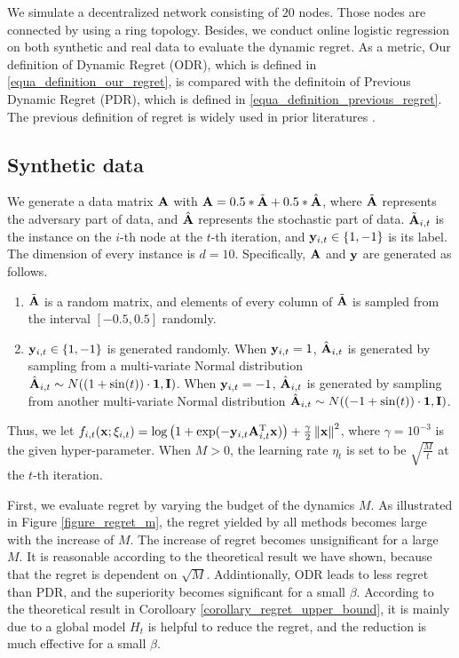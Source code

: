 \documentclass{article}
\begin{document}
We simulate a decentralized network consisting of $20$ nodes. Those nodes are connected by using a ring topology. Besides, we conduct online logistic regression on both synthetic and real data to evaluate the dynamic regret. As a metric, Our definition of Dynamic Regret (ODR), which is defined in \eqref{equa_definition_our_regret}, is compared with the  definitoin of Previous  Dynamic Regret (PDR), which is defined in \eqref{equa_definition_previous_regret}. The previous definition of regret is widely used in prior literatures \citep{Zinkevich:2003,Gyorgy:2016,8015179Shahram,Zhao:2018wx}. 


\subsection{Synthetic data}




We generate a data matrix ${\bf A}$ with ${\bf A}=0.5*\tilde{{\bf A}}+0.5*\hat{{\bf A}}$, where $\tilde{{\bf A}}$ represents the adversary part of data, and $\hat{{\bf A}}$ represents the stochastic part of data. $\tilde{{\bf A}}_{i,t}$ is the instance on the $i$-th node at the $t$-th iteration, and ${\bf y}_{i,t}\in\{1,-1\}$ is its label. The dimension of every instance is $d = 10$. Specifically, ${\bf A}$ and ${\bf y}$ are generated as follows.
\begin{enumerate}
\item $\tilde{{\bf A}}$ is a random matrix, and elements of every column of $\tilde{{\bf A}}$ is sampled from the interval $[-0.5,0.5]$ randomly.
\item ${\bf y}_{i,t}\in\{1,-1\}$ is generated randomly. When ${\bf y}_{i,t}=1$, $\hat{{\bf A}}_{i,t}$ is generated by sampling from a multi-variate Normal distribution $\hat{{\bf A}}_{i,t} \sim N((1+\sin(t))\cdot{\bf 1}, {\bf I})$. When ${\bf y}_{i,t} = -1$, $\hat{{\bf A}}_{i,t}$ is generated by sampling from another multi-variate Normal distribution $\hat{{\bf A}}_{i,t} \sim N((-1+\sin(t))\cdot{\bf 1}, {\bf I})$.
\end{enumerate} Thus, we let $f_{i,t}({\bf x};\xi_{i,t}) = \log\left( 1+\exp(-{\bf y}_{i,t}{\bf A}_{i,t}^{\rm T} {\bf x}) \right) + \frac{\gamma}{2}\left\lVert{\bf x}\right\rVert^2$, where $\gamma = 10^{-3}$ is the given hyper-parameter.   When $M>0$, the learning rate $\eta_t$ is set to be $\sqrt{\frac{M}{t}}$ at the $t$-th iteration.














First, we evaluate regret by varying the budget of the dynamics $M$.  As illustrated in Figure \ref{figure_regret_m}, the regret yielded by all methods becomes large with the increase of $M$. The increase of regret becomes unsignificant for a large $M$.  It is reasonable according to the theoretical result we have shown, because that the regret is dependent on $\sqrt{M}$. Addintionally, ODR leads to less regret than PDR, and the superiority becomes significant for a small $\beta$. According to the theoretical result in Corolloary \ref{corollary_regret_upper_bound}, it is mainly due to a global model $H_t$ is helpful to reduce the regret, and the reduction is much effective for a small $\beta$.   
\end{document}
